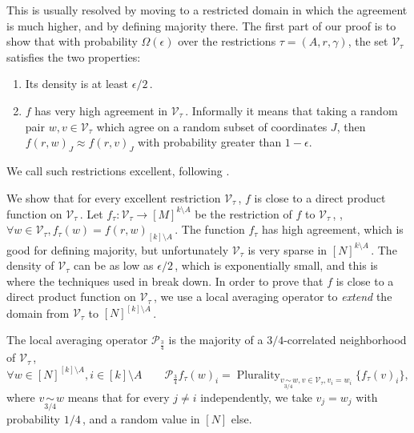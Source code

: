 \documentclass{toc}
\newcommand\f{f} %
\newcommand\cons{\mathcal{V}} %
\newcommand\cor[1]{\underset{\scriptscriptstyle#1}{\sim}} %
\DeclareMathOperator*\plur{\mathrm{Plurality}} %
\begin{document}
This is usually resolved by moving to a restricted domain in which the agreement is much higher, and by defining majority there. The first part of our proof is to show that with probability $\Omega(\epsilon)$ over the restrictions $\tau=(A,r,\gamma)$, the set $\cons_\tau$ satisfies the two properties:
\begin{enumerate}
	\item Its density is at least 
	${\epsilon}/{2}$\,. %
	\item $\f$ has very high agreement in $\cons_\tau$\,. Informally it means that taking a random pair $w,v\in \cons_\tau$ which agree on a random subset of coordinates $J$, then $\f(r,w)_J\approx\f(r,v)_J$ with probability greater than $1-\epsilon$.
\end{enumerate}
We call such restrictions excellent, following \cite{impagliazzo2012new}.

We show that for every excellent restriction $\cons_\tau$\,, $\f$ is close to a direct product function on $\cons_\tau$\,. Let $f_\tau:\cons_{\tau}\rightarrow[M]^{k\setminus A}$ be the restriction of $\f$ to $\cons_\tau$\,, \ie, $\forall w\in \cons_{\tau},\f_{\tau}(w) = \f(r,w)_{[k]\setminus A}$\,.
The function $f_\tau$ has high agreement, which is good for defining majority, but unfortunately $\cons_\tau$ is very sparse in $[N]^{k\setminus A}$\,. The density of $\cons_{\tau}$ can be as low as 
%
${\epsilon}/{2}$\,, %
which is exponentially small, and this is where the techniques used in \cite{impagliazzo2012new} break down. In order to prove that $\f$ is close to a direct product function on $\cons_{\tau}$\,, we use a local averaging operator to \emph{extend} the domain from $\cons_\tau$ to $[N]^{[k]\setminus A}$\,.

The local averaging operator $\mathcal{P}_\frac{3}{4}$ is the majority of a 
%
%
%
$3/4$-correlated  %
neighborhood of $\cons_\tau$\,,
\[ \forall w\in [N]^{[k]\setminus A},i\in [k]\setminus A \qquad \mathcal{P}_\frac{3}{4}f_\tau (w)_i = \plur_{v\cor{3/4}w, v\in\cons_\tau,v_i=w_i}\{f_\tau(v)_i \}, \]
where $v\cor{3/4}{w}$ means that for every $j\neq i$ independently, we take $v_j=w_j$ with probability 
%
$1/4$\,, %
and a random value in $[N]$ else.
\end{document}
